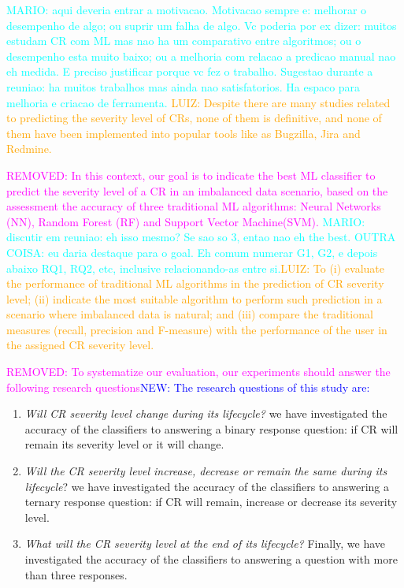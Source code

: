 \documentclass[10pt, conference]{IEEEtran}
\newcommand{\luiz}[1]{\noindent\textcolor{orange}{LUIZ: {#1}}}
\newcommand{\mario}[1]{\noindent\textcolor{cyan}{MARIO: {#1}}}
\newcommand{\rem}[1]{\noindent\textcolor{magenta}{REMOVED: {#1}}}
\newcommand{\new}[1]{\noindent\textcolor{blue}{NEW: {#1}}}
\newcommand{\luiz}[1]{}
\newcommand{\mario}[1]{}
\newcommand{\rem}[1]{}
\newcommand{\new}[1]{#1}
\begin{document}
\mario{aqui deveria entrar a motivacao. Motivacao sempre e: melhorar o desempenho de algo; ou suprir um falha de algo. Vc poderia por ex dizer: muitos estudam CR com ML mas nao ha um comparativo entre algoritmos; ou o desempenho esta muito baixo; ou a melhoria com relacao a predicao manual nao eh medida. E preciso justificar porque vc fez o trabalho. Sugestao durante a reuniao: ha muitos trabalhos mas ainda nao satisfatorios. Ha espaco para melhoria e criacao de ferramenta.}
\luiz{Despite there are many studies related to predicting the severity level of CRs, none of them is definitive, and none of them have been implemented into popular tools like as Bugzilla, Jira and Redmine.\cite{Cavalcanti2014}}

\rem{In this context, our goal is to indicate the best ML classifier to predict the severity level of a CR in an imbalanced data scenario, based on the assessment the accuracy of three traditional ML algorithms: Neural Networks (NN), Random Forest (RF) and Support Vector Machine(SVM).} \mario{discutir em reuniao: eh isso mesmo? Se sao so 3, entao nao eh the best. OUTRA COISA: eu daria destaque para o goal. Eh comum numerar G1, G2, e depois abaixo RQ1, RQ2, etc, inclusive relacionando-as entre si.}\luiz{To (i) evaluate the performance of traditional ML algorithms in the prediction of CR severity level; (ii) indicate the most suitable algorithm to perform such prediction in a scenario where imbalanced data is natural; and (iii) compare the traditional measures (recall, precision and F-measure) with the performance of the user in the assigned CR severity level.}

\rem{To systematize our evaluation, our experiments should answer the following research questions}\new{The research questions of this study are:}

\begin{enumerate}[$RQ_1:$]
  \item \textit{Will CR severity level change during its lifecycle?} we have investigated the accuracy of the classifiers to answering a binary response question: if CR will remain its severity level or it will change.
  \item \textit{Will the CR severity level increase, decrease or remain the same during its lifecycle}? we have investigated the accuracy of the classifiers to answering a ternary response question: if CR will remain, increase or decrease its severity level.
  \item \textit{What will the CR severity level at the end of its lifecycle?} Finally, we have investigated the accuracy of the classifiers to answering a question with more than three responses.
\end{enumerate}
\end{document}
